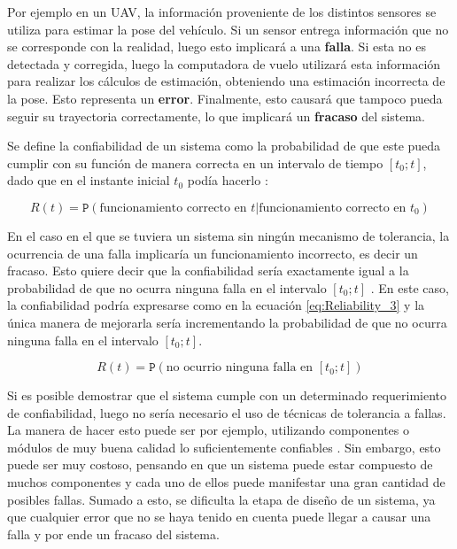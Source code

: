 Por ejemplo en un UAV, la información proveniente de los distintos sensores se utiliza para estimar la pose del vehículo. Si un sensor entrega información que no se corresponde con la realidad, luego esto implicará a una \textbf{falla}. Si esta no es detectada y corregida, luego la computadora de vuelo utilizará esta información para realizar los cálculos de estimación, obteniendo una estimación incorrecta de la pose. Esto representa un \textbf{error}. Finalmente, esto causará que tampoco pueda seguir su trayectoria correctamente, lo que implicará un \textbf{fracaso} del sistema.

Se define la confiabilidad de un sistema como la probabilidad de que este pueda cumplir con su función de manera correcta en un intervalo de tiempo $[t_0;t]$, dado que en el instante inicial $t_0$ podía hacerlo \cite[p.~10]{kopetz-2011}:

\begin{equation}
    R(t) = \mathtt{P}\left( \text{funcionamiento correcto en $t$} | \text{funcionamiento correcto en $t_0$} \right)
    \label{eq:Reliability}
\end{equation}

En el caso en el que se tuviera un sistema sin ningún mecanismo de tolerancia, la ocurrencia de una falla implicaría un funcionamiento incorrecto, es decir un fracaso. Esto quiere decir que la confiabilidad sería exactamente igual a la probabilidad de que no ocurra ninguna falla en el intervalo $[t_0;t]$ \cite{nelson1990fault}. En este caso, la confiabilidad podría expresarse como en la ecuación \eqref{eq:Reliability_3} y la única manera de mejorarla sería incrementando la probabilidad de que no ocurra ninguna falla en el intervalo $[t_0;t]$.

\begin{equation}
    R(t) = \mathtt{P}\left( \text{no ocurrio ninguna falla en $[t_0;t]$} \right)
    \label{eq:Reliability_3}
\end{equation}

Si es posible demostrar que el sistema cumple con un determinado requerimiento de confiabilidad, luego no sería necesario el uso de técnicas de tolerancia a fallas. La manera de hacer esto puede ser por ejemplo, utilizando componentes o módulos de muy buena calidad lo suficientemente confiables \cite{nelson1990fault}. Sin embargo, esto puede ser muy costoso, pensando en que un sistema puede estar compuesto de muchos componentes y cada uno de ellos puede manifestar una gran cantidad de posibles fallas. Sumado a esto, se dificulta la etapa de diseño de un sistema, ya que cualquier error que no se haya tenido en cuenta puede llegar a causar una falla y por ende un fracaso del sistema.

